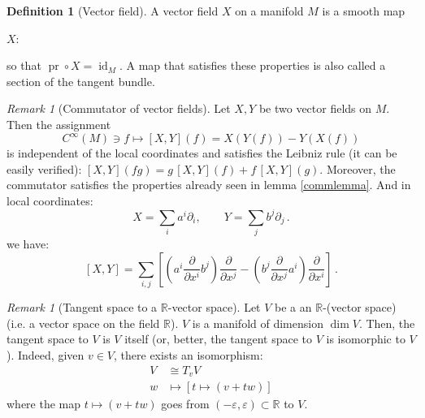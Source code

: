 \documentclass[a4paper,11pt,titlepage, article, oneside]{memoir}
\numberwithin{equation}{section}
\theoremstyle{definition}
\newtheorem{definition}[theorem]{Definition}
\theoremstyle{remark}
\newtheorem{remark}[theorem]{Remark}
\DeclareMathOperator{\id}{id}
\DeclareMathOperator{\pr}{pr}
\newcommand{\rfield}{\mathbb{R}}
\newcommand{\deonde}[1]{\frac{\partial}{\partial {#1}}}
\begin{document}
\begin{definition}[Vector field]
A vector field $X$ on a manifold $M$ is a smooth map
\begin{center}
$X \colon$
\end{center}
so that $\pr \circ X = \id_M$. A map that satisfies these properties is also called a section of the tangent bundle.
\end{definition}

\begin{remarkbox}\begin{remark} [Commutator of vector fields]
Let $X, Y$ be two vector fields on $M$. Then the assignment
\begin{equation*}
C^{\infty}(M) \ni f \longmapsto [X, Y](f) = X \left(Y(f)\right) - Y \left(X(f)\right)
\end{equation*}
is independent of the local coordinates  and satisfies the Leibniz rule (it can be easily verified): $[X, Y](fg) = g\, [X, Y](f) + f \, [X, Y](g)$. Moreover, the commutator satisfies the properties already seen in lemma \ref{commlemma}. And in local coordinates:
\[ X= \sum\limits_i a^i \partial_i, \qquad Y= \sum\limits_j b^j \partial_j \, . \]
we have:
\[ [X, Y] = \sum\limits_{i, j}\left[ \left (a^i \deonde{x^i} b^j \right) \deonde{x^j} - \left(b^j \deonde{x^j}a^i \right) \deonde{x^i} \right] \, . \]
\end{remark}\end{remarkbox}

\begin{remarkbox}\begin{remark}[Tangent space to a $\rfield$-vector space]
Let $V$ be a an $\rfield$-(vector space) (i.e. a vector space on the field $\rfield$). $V$ is a manifold of dimension $\dim V$. Then, the tangent space to $V$ is $V$ itself (or, better, the tangent space to $V$ is isomorphic to $V$). Indeed, given $v \in V$, there exists an isomorphism:
\begin{align*}
V &\cong T_v V \\
w &\mapsto \left[ t \mapsto (v + tw)\right]
\end{align*}
where the map $t \mapsto (v + tw)$ goes from $(-\varepsilon, \varepsilon) \subset \rfield$ to $V$.
\end{remark}\end{remarkbox}
\end{document}
